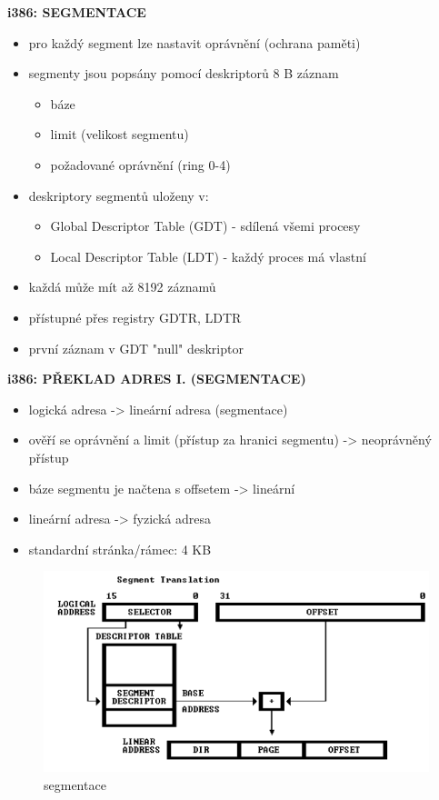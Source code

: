 \documentclass[10pt,a4paper]{article}
\begin{document}
\textbf{i386: SEGMENTACE}
\begin{itemize}
	\item pro každý segment lze nastavit oprávnění (ochrana paměti)
	\item segmenty jsou popsány pomocí deskriptorů 8 B záznam
	\begin{itemize}
		\item báze
		\item limit (velikost segmentu)
		\item požadované oprávnění (ring 0-4)
	\end{itemize}
	\item deskriptory segmentů uloženy v:
	\begin{itemize}
		\item Global Descriptor Table (GDT) - sdílená všemi procesy
		\item Local Descriptor Table (LDT) - každý proces má vlastní
	\end{itemize}
	\item každá může mít až 8192 záznamů
	\item přístupné přes registry GDTR, LDTR
	\item první záznam v GDT "null" deskriptor
\end{itemize}

\textbf{i386: PŘEKLAD ADRES I. (SEGMENTACE)}
\begin{itemize}
	\item logická adresa -> lineární adresa (segmentace)
	\item ověří se oprávnění a limit (přístup za hranici segmentu) -> neoprávněný přístup
	\item báze segmentu je načtena s offsetem -> lineární
	\item lineární adresa -> fyzická adresa
	\item standardní stránka/rámec: 4 KB
\end{itemize}
\begin{figure} [h]
	\includegraphics[scale=0.8]{img/segmentace.png}
	\caption{segmentace}	
\end{figure}
\end{document}
